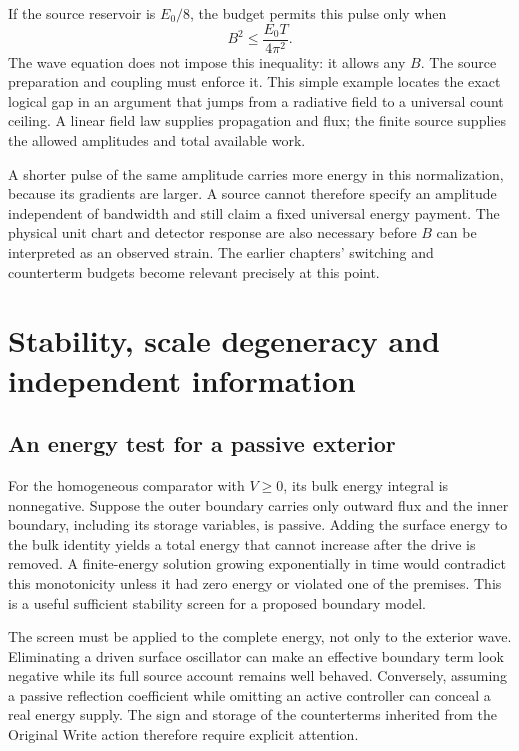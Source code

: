 If the source reservoir is $E_0/8$, the budget permits this pulse only when
\begin{equation}
 B^2\leq\frac{E_0T}{4\pi^2}.
 \label{c11:pulsebudget}
\end{equation}
The wave equation does not impose this inequality: it allows any $B$. The source preparation and coupling must enforce it. This simple example locates the exact logical gap in an argument that jumps from a radiative field to a universal count ceiling. A linear field law supplies propagation and flux; the finite source supplies the allowed amplitudes and total available work.

A shorter pulse of the same amplitude carries more energy in this normalization, because its gradients are larger. A source cannot therefore specify an amplitude independent of bandwidth and still claim a fixed universal energy payment. The physical unit chart and detector response are also necessary before $B$ can be interpreted as an observed strain. The earlier chapters' switching and counterterm budgets become relevant precisely at this point.

\section{Stability, scale degeneracy and independent information}
\subsection{An energy test for a passive exterior}
For the homogeneous comparator with $V\geq0$, its bulk energy integral is nonnegative. Suppose the outer boundary carries only outward flux and the inner boundary, including its storage variables, is passive. Adding the surface energy to the bulk identity yields a total energy that cannot increase after the drive is removed. A finite-energy solution growing exponentially in time would contradict this monotonicity unless it had zero energy or violated one of the premises. This is a useful sufficient stability screen for a proposed boundary model.

The screen must be applied to the complete energy, not only to the exterior wave. Eliminating a driven surface oscillator can make an effective boundary term look negative while its full source account remains well behaved. Conversely, assuming a passive reflection coefficient while omitting an active controller can conceal a real energy supply. The sign and storage of the counterterms inherited from the Original Write action therefore require explicit attention.

